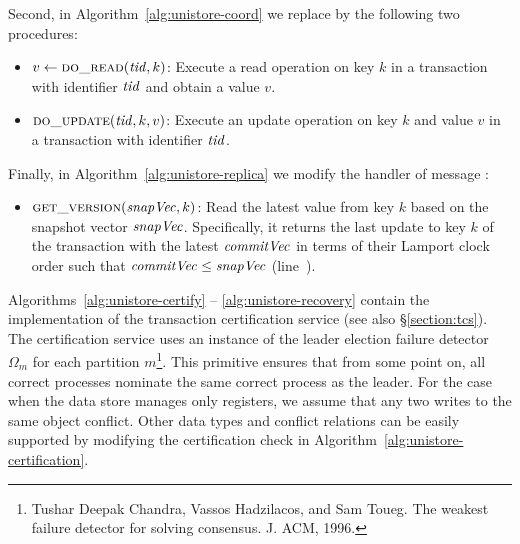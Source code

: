 Second, in Algorithm~\ref{alg:unistore-coord}
we replace \doop{} by the following two procedures:

\begin{itemize}
  \item $v \gets \Call{\doread}{\tidvar, k}$:
    Execute a read operation on key $k$
    in a transaction with identifier $\mathit{tid}$ and obtain a value $v$.
  \item $\Call{\doupdate}{\tidvar, k, v}$:
    Execute an update operation on key $k$ and value $v$
    in a transaction with identifier $\mathit{tid}$.
\end{itemize}

Finally, in Algorithm~\ref{alg:unistore-replica}
we modify the handler of message \getversion{}:
\begin{itemize}
  \item $\Call{\readkey}{\snapvc, k}$:
    Read the latest value from key $k$
    based on the snapshot vector $\mathit{snapVec}$.
    Specifically, it returns the last update to key $k$ of the transaction
    with the latest $\mathit{commitVec}$ in terms of their Lamport clock order
    such that $\mathit{commitVec} \leq \mathit{snapVec}$
    (line~\code{\ref{alg:unistore-replica}}{\ref{line:readkey-read}}).
\end{itemize}

Algorithms~\ref{alg:unistore-certify} -- \ref{alg:unistore-recovery} contain the
implementation of the transaction certification service (see also
\S\ref{section:tcs}). The certification service uses an instance of the leader
election failure detector $\Omega_m$ for each partition $m$\footnote{Tushar
  Deepak Chandra, Vassos Hadzilacos, and Sam Toueg. The weakest failure detector
  for solving consensus. J. ACM, 1996.}. This primitive ensures that from some
point on, all correct processes nominate the same correct process as the leader.
For the case when the data store manages only registers, we assume that any two
writes to the same object conflict. Other data types and conflict relations can
be easily supported by modifying the certification check in
Algorithm~\ref{alg:unistore-certification}.

\setcounter{algorithm}{0}




\clearpage






